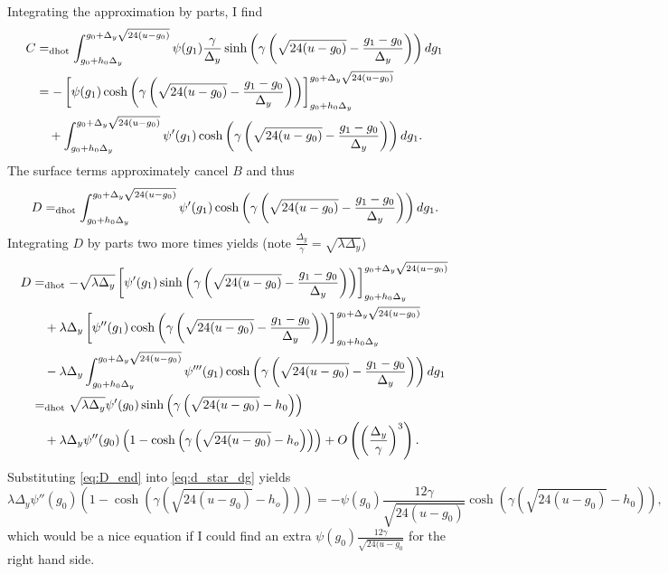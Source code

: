 \documentclass[]{article}
\newcommand{\dhot}{=_{\text{dhot}}}
\begin{document}
Integrating the approximation by parts, I find
\begin{align*}
  C &\dhot \int_{\Lg}^{\Ug} \psi(g_1) \frac{\gamma}{\Delta_y}
  \sinh \left( \gamma \left(
      \sqrt{24(u-g_0)} - \frac{g_1 - g_0 }{ \Delta_y}
    \right) \right) dg_1 \\
  &= -\left[ \psi(g_1) \cosh \left( \gamma \left(
      \sqrt{24(u-g_0)} - \frac{g_1 - g_0 }{ \Delta_y}
    \right) \right)\right]_{\Lg}^{\Ug} \\
& \quad + \int_{\Lg}^{\Ug} \psi'(g_1) \cosh \left( \gamma \left(
      \sqrt{24(u-g_0)} - \frac{g_1 - g_0 }{ \Delta_y}
    \right) \right) dg_1.
\end{align*}
The surface terms approximately cancel $B$ and thus
\begin{equation*}
  D \dhot \int_{\Lg}^{\Ug} \psi'(g_1) \cosh \left( \gamma \left(
      \sqrt{24(u-g_0)} - \frac{g_1 - g_0 }{ \Delta_y}
    \right) \right) dg_1.
\end{equation*}
Integrating $D$ by parts two more times yields (note
$\frac{\Delta_y}{\gamma} = \sqrt{\lambda \Delta_y}$)
\begin{align}
  D &\dhot -\sqrt{\lambda \Delta_y} \left[ \psi'(g_1) \sinh \left(
      \gamma \left( \sqrt{24(u-g_0)} - \frac{g_1 - g_0 }{ \Delta_y}
      \right) \right)\right]_{\Lg}^{\Ug} \nonumber \\
& \quad +\lambda \Delta_y \left[ \psi''(g_1) \cosh \left( \gamma \left(
      \sqrt{24(u-g_0)} - \frac{g_1 - g_0 }{ \Delta_y}
    \right) \right)\right]_{\Lg}^{\Ug} \nonumber \\
& \quad - \lambda \Delta_y \int_{\Lg}^{\Ug} \psi'''(g_1) \cosh \left(
  \gamma \left( \sqrt{24(u-g_0)} - \frac{g_1 - g_0 }{ \Delta_y}
  \right) \right) dg_1 \nonumber \\
\label{eq:D_end}
&\dhot \sqrt{\lambda \Delta_y} \psi'(g_0) \sinh \left( \gamma
  \left( \sqrt{24(u-g_0)} - h_0 \right) \right) \\
& \quad +\lambda \Delta_y \psi''(g_0) \left( 1 - \cosh \left( \gamma \left(
      \sqrt{24(u-g_0)} - h_o \right) \right) \right) + O\left(
  \left( \frac{\Delta_y}{\gamma} \right)^3 \right). \nonumber
\end{align}
Substituting \eqref{eq:D_end} into \eqref{eq:d_star_dg} yields
\begin{equation}
  \label{eq:hope}
  \lambda \Delta_y \psi''(g_0) \left( 1 - \cosh \left( \gamma \left(
        \sqrt{24(u-g_0)} - h_o \right) \right) \right) = -\psi(g_0)
  \frac{12 \gamma}{\sqrt{24(u-g_0)}} \cosh\left( \gamma
    \left(\sqrt{24(u-g_0)} -h_0 \right) \right),
\end{equation}
which would be a nice equation if I could find an extra
$\psi(g_0)\frac{12\gamma}{\sqrt{24(u-g_0}}$ for the right hand side.
\end{document}
